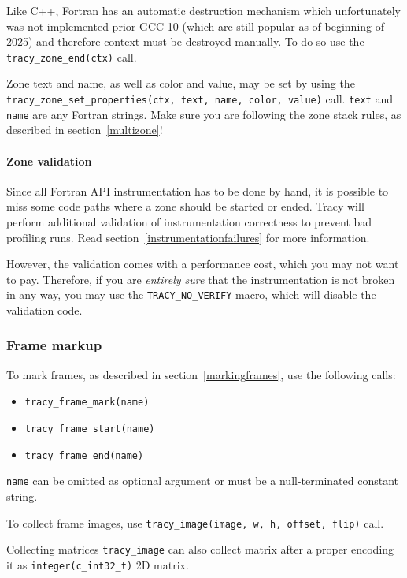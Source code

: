 \documentclass[hidelinks,titlepage,a4paper,twoside]{article}
\begin{document}
Like C++, Fortran has an automatic destruction mechanism which unfortunately was not implemented prior GCC 10 (which are still popular as of beginning of 2025) and therefore context must be destroyed manually.
To do so use the \texttt{tracy\_zone\_end(ctx)} call.

Zone text and name, as well as color and value, may be set by using the \texttt{tracy\_zone\_set\_properties(ctx, text, name, color, value)} call.
\texttt{text} and \texttt{name} are any Fortran strings.
Make sure you are following the zone stack rules, as described in section~\ref{multizone}!

\paragraph{Zone validation}

Since all Fortran API instrumentation has to be done by hand, it is possible to miss some code paths where a zone should be started or ended. Tracy will perform additional validation of instrumentation correctness to prevent bad profiling runs. Read section~\ref{instrumentationfailures} for more information.

However, the validation comes with a performance cost, which you may not want to pay. Therefore, if you are \emph{entirely sure} that the instrumentation is not broken in any way, you may use the \texttt{TRACY\_NO\_VERIFY} macro, which will disable the validation code.

\subsubsection{Frame markup}

To mark frames, as described in section~\ref{markingframes}, use the following calls:

\begin{itemize}
\item \texttt{tracy\_frame\_mark(name)}
\item \texttt{tracy\_frame\_start(name)}
\item \texttt{tracy\_frame\_end(name)}
\end{itemize}

\texttt{name} can be omitted as optional argument or must be a null-terminated constant string.

To collect frame images, use \texttt{tracy\_image(image, w, h, offset, flip)} call.

\begin{bclogo}[
noborder=true,
couleur=black!5,
logo=\bclampe
]{Collecting matrices}
\texttt{tracy\_image} can also collect matrix after a proper encoding it as \texttt{integer(c\_int32\_t)} 2D matrix.
\end{bclogo}
\end{document}
